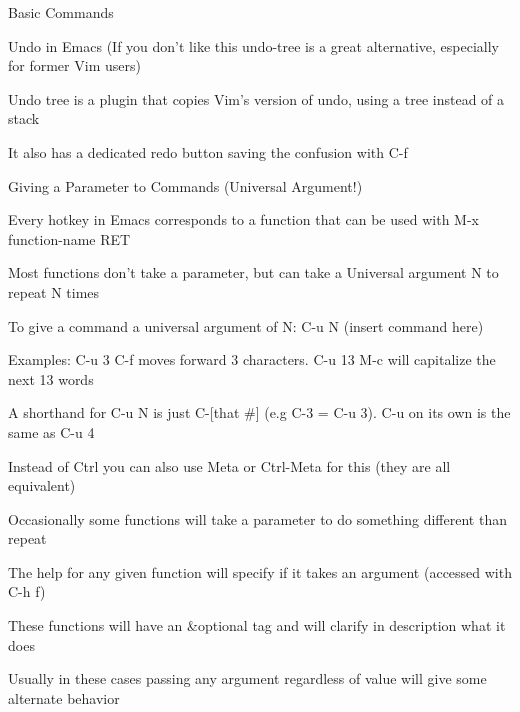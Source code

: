 \documentclass[presentation]{beamer}
\begin{document}
\begin{frame}[label=sec-2]{Basic Commands}
\begin{block}{Undo in Emacs (If you don't like this undo-tree is a great alternative, especially for former Vim users)}
\begin{block}{Undo tree is a plugin that copies Vim's version of undo, using a tree instead of a stack}
\begin{block}{It also has a dedicated redo button saving the confusion with C-f}
\end{block}
\end{block}
\end{block}
\begin{block}{Giving a Parameter to Commands (Universal Argument!)}
\begin{block}{Every hotkey in Emacs corresponds to a function that can be used with M-x function-name RET}
\end{block}
\begin{block}{Most functions don't take a parameter, but can take a Universal argument N to repeat N times}
\begin{block}{To give a command a universal argument of N: C-u N (insert command here)}
\begin{block}{Examples: C-u 3 C-f moves forward 3 characters. C-u 13 M-c will capitalize the next 13 words}
\end{block}
\end{block}
\begin{block}{A shorthand for C-u N is just C-[that \#] (e.g C-3 = C-u 3). C-u on its own is the same as C-u 4}
\begin{block}{Instead of Ctrl you can also use Meta or Ctrl-Meta for this (they are all equivalent)}
\end{block}
\end{block}
\begin{block}{Occasionally some functions will take a parameter to do something different than repeat}
\begin{block}{The help for any given function will specify if it takes an argument (accessed with C-h f)}
\begin{block}{These functions will have an \&optional tag and will clarify in description what it does}
\end{block}
\end{block}
\begin{block}{Usually in these cases passing any argument regardless of value will give some alternate behavior}
\end{block}
\end{block}
\end{block}
\end{block}
\end{frame}
\end{document}
